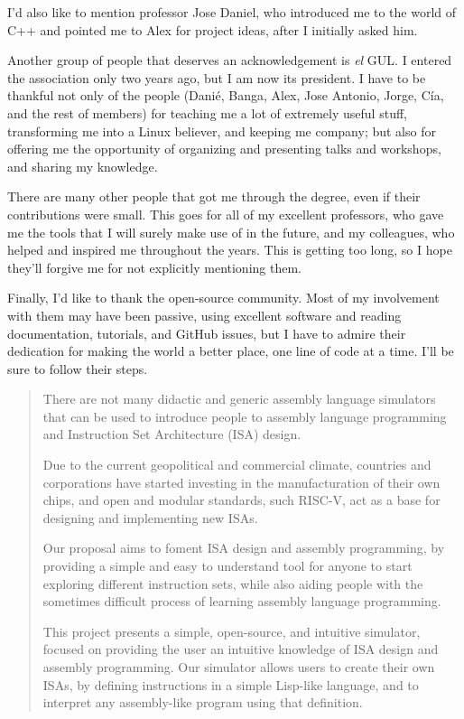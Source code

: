 \documentclass[en]{uc3mthesisIEEE}
\begin{document}
\begin{acknowledgements}
    I'd also like to mention professor Jose Daniel, who introduced me to the world of C++ and pointed me to Alex for project ideas, after I initially asked him.

    Another group of people that deserves an acknowledgement is \textit{el} GUL. I entered the association only two years ago, but I am now its president. I have to be thankful not only of the people (Danié, Banga, Alex, Jose Antonio, Jorge, Cía, and the rest of members) for teaching me a lot of extremely useful stuff, transforming me into a Linux believer, and keeping me company; but also for offering me the opportunity of organizing and presenting talks and workshops, and sharing my knowledge.

    There are many other people that got me through the degree, even if their contributions were small. This goes for all of my excellent professors, who gave me the tools that I will surely make use of in the future, and my colleagues, who helped and inspired me throughout the years. This is getting too long, so I hope they'll forgive me for not explicitly mentioning them.

    Finally, I'd like to thank the open-source community. Most of my involvement with them may have been passive, using excellent software and reading documentation, tutorials, and GitHub issues, but I have to admire their dedication for making the world a better place, one line of code at a time. I'll be sure to follow their steps.
  \end{acknowledgements}


  \begin{abstract}
    There are not many didactic and generic assembly language simulators that can be used to introduce people to assembly language programming and Instruction Set Architecture (ISA) design.

    Due to the current geopolitical and commercial climate, countries and corporations have started investing in the manufacturation of their own chips, and open and modular standards, such RISC-V, act as a base for designing and implementing new ISAs.

    Our proposal aims to foment ISA design and assembly programming, by providing a simple and easy to understand tool for anyone to start exploring different instruction sets, while also aiding people with the sometimes difficult process of learning assembly language programming.

    This project presents a simple, open-source, and intuitive simulator, focused on providing the user an intuitive knowledge of ISA design and assembly programming. Our simulator allows users to create their own ISAs, by defining instructions in a simple Lisp-like language, and to interpret any assembly-like program using that definition.

  \end{abstract}
\end{document}
